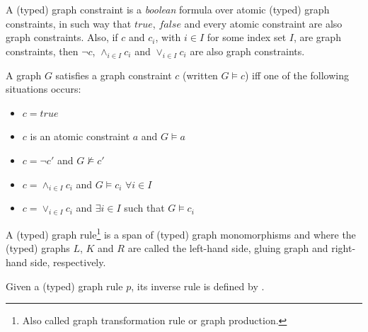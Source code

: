 \begin{definition} A (typed) graph constraint is a \emph{boolean} formula over atomic (typed) graph constraints, in such way that $true$, $false$ and every atomic constraint are also graph constraints. Also, if $c$ and $c_i$, with $i \in I$ for some index set $I$, are graph constraints, then $\neg c$, $\land_{i \in I} c_i$ and $\lor_{i \in I} c_i$ are also graph constraints.

  A graph $G$ satisfies a graph constraint $c$ (written $G \models c$) iff one of the following situations occurs:
  \begin{itemize}
    \item $c = true$
    \item $c$ is an atomic constraint $a$ and $G \models a$
    \item $c = \neg c'$ and $G \not\models c'$
    \item $c = \land_{i \in I}c_i$ and $G \models c_i$ $\forall i \in I$ 
    \item $c = \lor_{i \in I}c_i$  and $\exists i \in I$ such that $G \models c_i$
  \end{itemize}
\end{definition}

\begin{example}
\end{example}
\fi

\begin{definition}\label{def:graph-rule} A (typed) graph rule\footnote{Also called graph transformation rule or graph production.} \graphrule{} is a span of (typed) graph monomorphisms \lefthand{} and \righthand{}  where the (typed) graphs $L$, $K$ and $R$ are called the left-hand side, gluing graph and right-hand side, respectively.

  Given a (typed) graph rule $p$, its inverse rule is defined by \inversegraphrule.
\end{definition}

